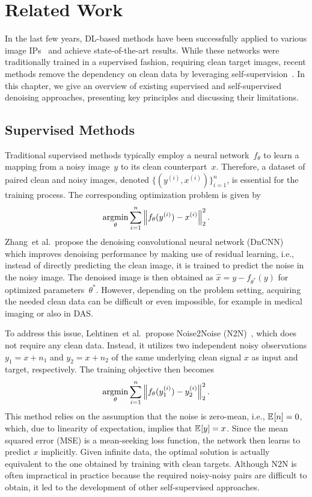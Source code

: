 \chapter{Related Work}

In the last few years, DL-based methods have been successfully applied to various image IPs~\cite{DN,SR,IP} and achieve state-of-the-art results.
While these networks were traditionally trained in a supervised fashion, requiring clean target images, recent methods remove the dependency on clean data by leveraging self-supervision~\cite{SelfSupervisedDenoising}.
In this chapter, we give an overview of existing supervised and self-supervised denoising approaches, presenting key principles and discussing their limitations.

\section{Supervised Methods}

Traditional supervised methods typically employ a neural network~$f_\theta$ to learn a mapping from a noisy image~$y$ to its clean counterpart~$x$.
Therefore, a dataset of paired clean and noisy images, denoted $\{(y^{(i)},x^{(i)})\}_{i=1}^n$, is essential for the training process.
The corresponding optimization problem is given by
\begin{equation}\label{eq:N2C}
    \operatorname*{argmin}_\theta \sum_{i=1}^{n} \left\lVert f_\theta(y^{(i)}) - x^{(i)}\right\rVert_2^2.
\end{equation}
Zhang~et al.\ propose the denoising convolutional neural network (DnCNN)~\cite{DnCNN} which improves denoising performance by making use of residual learning, i.e., instead of directly predicting the clean image, it is trained to predict the noise in the noisy image.
The denoised image is then obtained as $\hat{x} = y - f_{\theta^*}(y)$ for optimized parameters~$\theta^*$.
However, depending on the problem setting, acquiring the needed clean data can be difficult or even impossible, for example in medical imaging or also in DAS\@.

To address this issue, Lehtinen~et al.\ propose Noise2Noise (N2N)~\cite{N2N}, which does not require any clean data.
Instead, it utilizes two independent noisy observations $y_1 = x + n_1$ and $y_2 = x + n_2$ of the same underlying clean signal $x$ as input and target, respectively.
The training objective then becomes
\begin{equation}\label{eq:N2N}
    \operatorname*{argmin}_\theta \sum_{i=1}^{n} \left\lVert f_\theta(y_1^{(i)}) - y_2^{(i)}\right\rVert_2^2.
\end{equation}
This method relies on the assumption that the noise is zero-mean, i.e., $\mathbb{E}_{ } [n] = 0$, which, due to linearity of expectation, implies that $\mathbb{E}_{ } [y] = x$.
Since the mean squared error (MSE) is a mean-seeking loss function, the network then learns to predict $x$ implicitly.
Given infinite data, the optimal solution is actually equivalent to the one obtained by training with clean targets.
Although N2N is often impractical in practice because the required noisy-noisy pairs are difficult to obtain, it led to the development of other self-supervised approaches.

